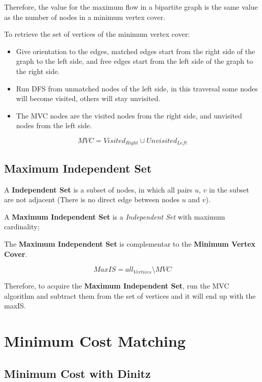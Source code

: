 		Therefore, the value for the maximum flow in a bipartite graph is the same value as the number of nodes in a minimum vertex cover.

		To retrieve the set of vertices of the minimum vertex cover:
		\begin{itemize}
			\item Give orientation to the edges, matched edges start from the right side of the graph to the left side, and free edges start from the left side of the graph to the right side.
			\item Run DFS from unmatched nodes of the left side, in this traversal some nodes will become visited, others will stay unvisited.
			\item The MVC nodes are the visited nodes from the right side, and unvisited nodes from the left side.
		\end{itemize}

		$$ MVC = Visited_{Right} \cup Unvisited_{Left} $$


	\subsection{Maximum Independent Set}

		A \textbf{Independent Set} is a subset of nodes, in which all pairs {$u$, $v$} in the subset are not adjacent (There is no direct edge between nodes $u$ and $v$).
		
		A \textbf{Maximum Independent Set} is a \textit{Independent Set} with maximum cardinality;

		The \textbf{Maximum Independent Set} is complementar to the \textbf{Minimum Vertex Cover}.

		$$ MaxIS = all_{Vertices} \setminus MVC $$

		Therefore, to acquire the \textbf{Maximum Independent Set}, run the MVC algorithm and subtract them from the set of vertices and it will end up with the maxIS.

\section{Minimum Cost Matching}
	
	\subsection{Minimum Cost with Dinitz}


